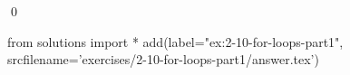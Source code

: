 
\begin{ex}
  \label{ex:2-10-for-loops-part1}
  
  \qed
\end{ex}
\begin{python0}
from solutions import *
add(label="ex:2-10-for-loops-part1",
    srcfilename='exercises/2-10-for-loops-part1/answer.tex')
\end{python0}
